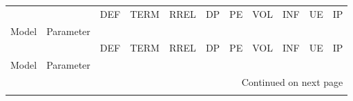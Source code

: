 \begin{longtable}{llrrrrrrrrr}
\label{tab:SSD_ABS_standardised_10_retrained}\\
\toprule
       &     &   DEF &  TERM &  RREL &    DP &    PE &   VOL &   INF &    UE &    IP \\
Model & Parameter &       &       &       &       &       &       &       &       &       \\
\midrule
\endfirsthead

\toprule
       &     &   DEF &  TERM &  RREL &    DP &    PE &   VOL &   INF &    UE &    IP \\
Model & Parameter &       &       &       &       &       &       &       &       &       \\
\midrule
\endhead
\midrule
\multicolumn{11}{r}{{Continued on next page}} \\
\midrule
\endfoot


\end{longtable}
